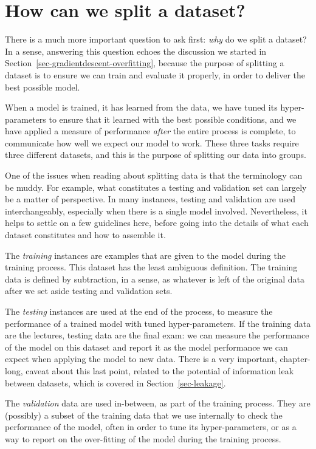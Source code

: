 \documentclass[
  letterpaper,
]{scrbook}
\begin{document}
\section{How can we split a dataset?}\label{how-can-we-split-a-dataset}

There is a much more important question to ask first: \emph{why} do we
split a dataset? In a sense, answering this question echoes the
discussion we started in Section~\ref{sec-gradientdescent-overfitting},
because the purpose of splitting a dataset is to ensure we can train and
evaluate it properly, in order to deliver the best possible model.

When a model is trained, it has learned from the data, we have tuned its
hyper-parameters to ensure that it learned with the best possible
conditions, and we have applied a measure of performance \emph{after}
the entire process is complete, to communicate how well we expect our
model to work. These three tasks require three different datasets, and
this is the purpose of splitting our data into groups.

One of the issues when reading about splitting data is that the
terminology can be muddy. For example, what constitutes a testing and
validation set can largely be a matter of perspective. In many
instances, testing and validation are used interchangeably, especially
when there is a single model involved. Nevertheless, it helps to settle
on a few guidelines here, before going into the details of what each
dataset constitutes and how to assemble it.

The \emph{training} instances are examples that are given to the model
during the training process. This dataset has the least ambiguous
definition. The training data is defined by subtraction, in a sense, as
whatever is left of the original data after we set aside testing and
validation sets.

The \emph{testing} instances are used at the end of the process, to
measure the performance of a trained model with tuned hyper-parameters.
If the training data are the lectures, testing data are the final exam:
we can measure the performance of the model on this dataset and report
it as the model performance we can expect when applying the model to new
data. There is a very important, chapter-long, caveat about this last
point, related to the potential of information leak between datasets,
which is covered in Section~\ref{sec-leakage}.

The \emph{validation} data are used in-between, as part of the training
process. They are (possibly) a subset of the training data that we use
internally to check the performance of the model, often in order to tune
its hyper-parameters, or as a way to report on the over-fitting of the
model during the training process.
\end{document}
